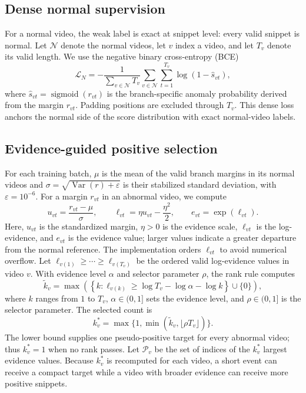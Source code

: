 \documentclass[preprint,12pt]{elsarticle}
\begin{document}
\subsection{Dense normal supervision}
For a normal video, the weak label is exact at snippet level: every valid snippet is normal. Let $\mathcal{N}$ denote the normal videos, let $v$ index a video, and let $T_v$ denote its valid length. We use the negative binary cross-entropy (BCE)
\begin{equation}
\mathcal{L}_{N}=-\frac{1}{\sum_{v\in\mathcal{N}}T_v}\sum_{v\in\mathcal{N}}
\sum_{t=1}^{T_v}\log\left(1-\hat{s}_{vt}\right),
\end{equation}
where $\hat{s}_{vt}=\operatorname{sigmoid}(r_{vt})$ is the branch-specific anomaly probability derived from the margin $r_{vt}$. Padding positions are excluded through $T_v$. This dense loss anchors the normal side of the score distribution with exact normal-video labels.

\subsection{Evidence-guided positive selection}
For each training batch, $\mu$ is the mean of the valid branch margins in its normal videos and $\sigma=\sqrt{\operatorname{Var}(r)+\varepsilon}$ is their stabilized standard deviation, with $\varepsilon=10^{-6}$. For a margin $r_{vt}$ in an abnormal video, we compute
\begin{equation}
    u_{vt}=\frac{r_{vt}-\mu}{\sigma}, \qquad
    \ell_{vt}=\eta u_{vt}-\frac{\eta^2}{2}, \qquad
    e_{vt}=\exp(\ell_{vt}).
\end{equation}
Here, $u_{vt}$ is the standardized margin, $\eta>0$ is the evidence scale, $\ell_{vt}$ is the log-evidence, and $e_{vt}$ is the evidence value; larger values indicate a greater departure from the normal reference. The implementation orders $\ell_{vt}$ to avoid numerical overflow. Let $\ell_{v(1)}\geq\cdots\geq\ell_{v(T_v)}$ be the ordered valid log-evidence values in video $v$. With evidence level $\alpha$ and selector parameter $\rho$, the rank rule computes
\begin{equation}
 \tilde{k}_v=\max\left(\left\{k:\ell_{v(k)}\geq \log T_v-\log\alpha-\log k\right\}\cup\{0\}\right),
 \label{eq:ebh}
\end{equation}
where $k$ ranges from $1$ to $T_v$, $\alpha\in(0,1]$ sets the evidence level, and $\rho\in(0,1]$ is the selector parameter. The selected count is
\[
    k_v^*=\max\{1,\min(\tilde{k}_v,\lfloor\rho T_v\rfloor)\}.
\]
The lower bound supplies one pseudo-positive target for every abnormal video; thus $k_v^*=1$ when no rank passes. Let $\mathcal{P}_v$ be the set of indices of the $k_v^*$ largest evidence values. Because $k_v^*$ is recomputed for each video, a short event can receive a compact target while a video with broader evidence can receive more positive snippets.
\end{document}
